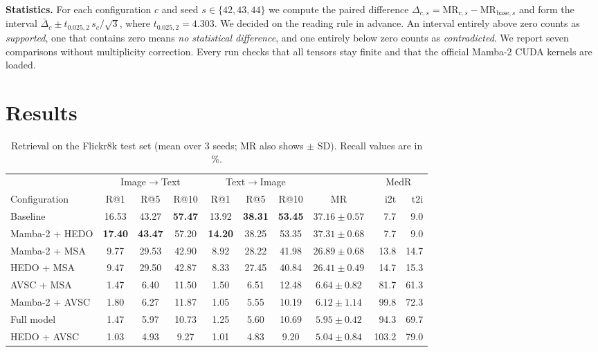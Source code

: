 \documentclass[pdflatex,sn-mathphys-num]{sn-jnl}
\begin{document}
\textbf{Statistics.} For each configuration $c$ and seed $s\in\{42,43,44\}$ we compute the paired difference $\Delta_{c,s}=\mathrm{MR}_{c,s}-\mathrm{MR}_{\mathrm{base},s}$ and form the interval $\bar\Delta_c\pm t_{0.025,2}\,s_c/\sqrt3$, where $t_{0.025,2}=4.303$. We decided on the reading rule in advance. An interval entirely above zero counts as \emph{supported}, one that contains zero means \emph{no statistical difference}, and one entirely below zero counts as \emph{contradicted}. We report seven comparisons without multiplicity correction. Every run checks that all tensors stay finite and that the official Mamba-2 CUDA kernels are loaded.



\section{Results}
\label{sec:results}

\begin{table}[t]
\centering
\caption{Retrieval on the Flickr8k test set (mean over 3 seeds; MR also shows $\pm$ SD). Recall values are in \%.}
\label{tab:main}
\setlength{\tabcolsep}{3.5pt}
\begin{tabular}{lcccccccrr}
\toprule
& \multicolumn{3}{c}{Image$\to$Text} & \multicolumn{3}{c}{Text$\to$Image} & & \multicolumn{2}{c}{MedR}\\
\cmidrule(lr){2-4}\cmidrule(lr){5-7}\cmidrule(lr){9-10}
Configuration & R@1 & R@5 & R@10 & R@1 & R@5 & R@10 & MR & i2t & t2i\\
\midrule
Baseline & 16.53 & 43.27 & \textbf{57.47} & 13.92 & \textbf{38.31} & \textbf{53.45} & $37.16\pm0.57$ & 7.7 & 9.0\\
Mamba-2 + HEDO & \textbf{17.40} & \textbf{43.47} & 57.20 & \textbf{14.20} & 38.25 & 53.35 & $\mathbf{37.31\pm0.68}$ & 7.7 & 9.0\\
\midrule
Mamba-2 + MSA & 9.77 & 29.53 & 42.90 & 8.92 & 28.22 & 41.98 & $26.89\pm0.68$ & 13.8 & 14.7\\
HEDO + MSA & 9.47 & 29.50 & 42.87 & 8.33 & 27.45 & 40.84 & $26.41\pm0.49$ & 14.7 & 15.3\\
\midrule
AVSC + MSA & 1.47 & 6.40 & 11.50 & 1.50 & 6.51 & 12.48 & $6.64\pm0.82$ & 81.7 & 61.3\\
Mamba-2 + AVSC & 1.80 & 6.27 & 11.87 & 1.05 & 5.55 & 10.19 & $6.12\pm1.14$ & 99.8 & 72.3\\
Full model & 1.47 & 5.97 & 10.73 & 1.25 & 5.60 & 10.69 & $5.95\pm0.42$ & 94.3 & 69.7\\
HEDO + AVSC & 1.03 & 4.93 & 9.27 & 1.01 & 4.83 & 9.20 & $5.04\pm0.84$ & 103.2 & 79.0\\
\bottomrule
\end{tabular}
\end{table}
\end{document}
